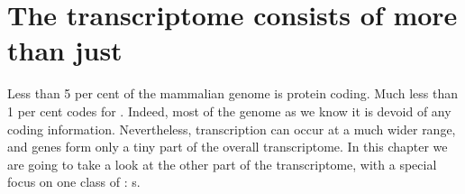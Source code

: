 \chapter{The  transcriptome consists of more than just }

Less than \num{5} per cent of the mammalian genome is protein coding. Much less
than \num{1} per cent codes for \trna[s]. Indeed, most of the genome as we know
it is devoid of any coding information. Nevertheless,  transcription can
occur at a much wider range, and \trna genes form only a tiny part of the
overall  transcriptome. In this chapter we are going to take a look at the
other part of the  transcriptome, with a special focus on one class of
: s.


